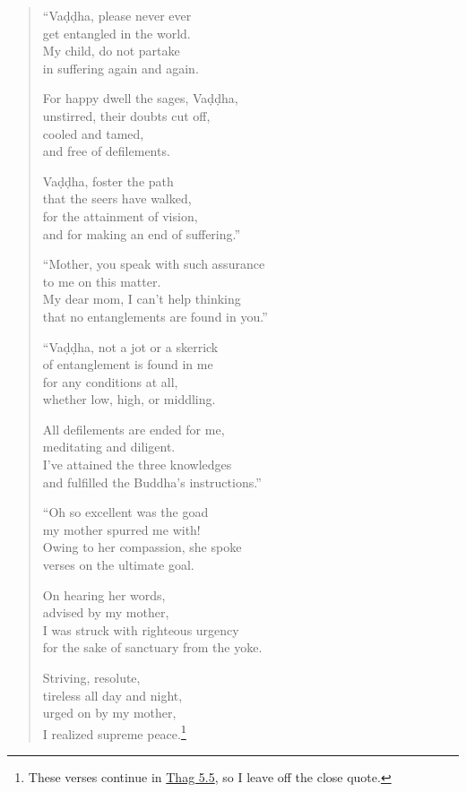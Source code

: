 \documentclass[12pt,openany]{book}%
\begin{document}
\begin{verse}%
“\textsanskrit{Vaḍḍha}, please never ever \\
get entangled in the world. \\
My child, do not partake \\
in suffering again and again. 

For happy dwell the sages, \textsanskrit{Vaḍḍha}, \\
unstirred, their doubts cut off, \\
cooled and tamed, \\
and free of defilements. 

\textsanskrit{Vaḍḍha}, foster the path \\
that the seers have walked, \\
for the attainment of vision, \\
and for making an end of suffering.” 

“Mother, you speak with such assurance \\
to me on this matter. \\
My dear mom, I can’t help thinking \\
that no entanglements are found in you.” 

“\textsanskrit{Vaḍḍha}, not a jot or a skerrick \\
of entanglement is found in me \\
for any conditions at all, \\
whether low, high, or middling. 

All defilements are ended for me, \\
meditating and diligent. \\
I’ve attained the three knowledges \\
and fulfilled the Buddha’s instructions.” 

“Oh so excellent was the goad \\
my mother spurred me with! \\
Owing to her compassion, she spoke \\
verses on the ultimate goal. 

On hearing her words, \\
advised by my mother, \\
I was struck with righteous urgency \\
for the sake of sanctuary from the yoke. 

Striving, resolute, \\
tireless all day and night, \\
urged on by my mother, \\
I realized supreme peace.\footnote{These verses continue in \href{https://suttacentral.net/thag5.5/en/sujato}{Thag 5.5}, so I leave off the close quote. } 

%
\end{verse}
\end{document}
